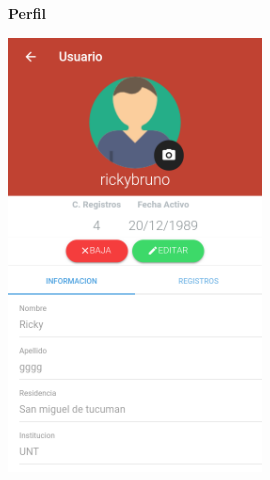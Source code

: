 				\begin{figure}[H]
					\hspace*{1cm}\raggedright\large\textbf{Perfil}\par\medskip
					\centering
						\includegraphics[width=0.6\textwidth]{Screenshots/perfil.png}
				\end{figure}
				

